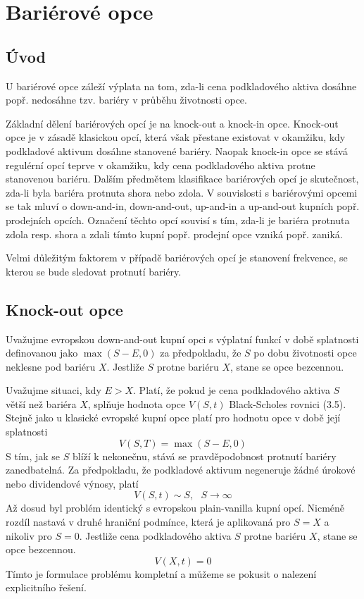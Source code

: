 \documentclass[a4paper]{book}
\begin{document}
\chapter{Bariérové opce}

\section{Úvod}

U bariérové opce záleží výplata na tom, zda-li cena podkladového aktiva dosáhne popř. nedosáhne tzv. bariéry v průběhu životnosti opce.

Základní dělení bariérových opcí je na knock-out a knock-in opce. Knock-out opce je v zásadě klasickou opcí, která však přestane existovat v okamžiku, kdy podkladové aktivum dosáhne stanovené bariéry. Naopak knock-in opce se stává regulérní opcí teprve v okamžiku, kdy cena podkladového aktiva protne stanovenou bariéru. Dalším předmětem klasifikace bariérových opcí je skutečnost, zda-li byla bariéra protnuta shora nebo zdola. V souvislosti s bariérovými opcemi se tak mluví o down-and-in, down-and-out, up-and-in a up-and-out kupních popř. prodejních opcích. Označení těchto opcí souvisí s tím, zda-li je bariéra protnuta zdola resp. shora a zdali tímto kupní popř. prodejní opce vzniká popř. zaniká.

Velmi důležitým faktorem v případě bariérových opcí je stanovení frekvence, se kterou se bude sledovat protnutí bariéry.

\section{Knock-out opce}

Uvažujme evropskou down-and-out kupní opci s výplatní funkcí v době splatnosti definovanou jako $\max(S-E,0)$ za předpokladu, že $S$ po dobu životnosti opce neklesne pod bariéru $X$. Jestliže $S$ protne bariéru $X$, stane se opce bezcennou.

Uvažujme situaci, kdy $E > X$. Platí, že pokud je cena podkladového aktiva $S$ větší než bariéra $X$, splňuje hodnota opce $V(S,t)$ Black-Scholes rovnici (3.5). Stejně jako u klasické evropské kupní opce platí pro hodnotu opce v době její splatnosti
\begin{equation*}
V(S,T) = \max(S-E,0)
\end{equation*}
S tím, jak se $S$ blíží k nekonečnu, stává se pravděpodobnost protnutí bariéry zanedbatelná. Za předpokladu, že podkladové aktivum negeneruje žádné úrokové nebo dividendové výnosy, platí
\begin{equation*}
V(S, t) \sim S,~~~S \rightarrow \infty
\end{equation*}
Až dosud byl problém identický s evropskou plain-vanilla kupní opcí. Nicméně rozdíl nastavá v druhé hraniční podmínce, která je aplikovaná pro $S = X$ a nikoliv pro $S = 0$. Jestliže cena podkladového aktiva $S$ protne bariéru $X$, stane se opce bezcennou.
\begin{equation*}
V(X, t) = 0
\end{equation*}
Tímto je formulace problému kompletní a můžeme se pokusit o nalezení explicitního řešení.
\end{document}
